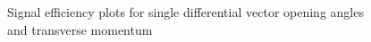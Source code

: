 \documentclass{article}
\begin{document}
\begin{figure}
    \caption{Signal efficiency plots for single differential vector opening angles and transverse momentum}
    \label{fig:sbnd-signal-efficiency-opening-angles-transverse}
\end{figure}
\end{document}
